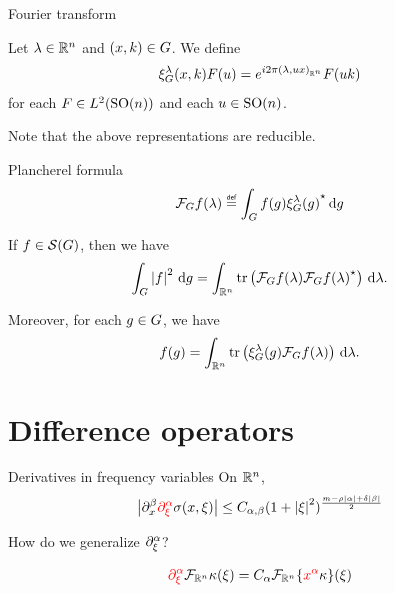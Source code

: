 \documentclass{beamer}
\begin{document}
\begin{frame}{Fourier transform}
    \begin{definition}[Representations]
        Let $\lambda \in \R^n$ and $(x, k) \in \Group$.
        We define
        \begin{align*}
            \Rep \lambda(x, k) F(u)
            = \e^{\i \turn \ip [\R^n] \lambda {u x}} F(u k)
        \end{align*}
        for each $F \in \Lebesgue 2 {\SpecialOrthogonalGroup n}$ and each $u \in \SpecialOrthogonalGroup n$.
    \end{definition}

    Note that the above representations are reducible.
\end{frame}

\begin{frame}{Plancherel formula}
    \begin{align*}
        \Fourier f(\lambda) \defeq \int_\Group f(g) \adj{\Rep \lambda(g)} \dd g
    \end{align*}

    \pause

    \begin{theorem}
        If $f \in \Schwartz \Group$,
        then we have
        \begin{align*}
            \int_\Group \abs f^2 \dd g
            = \int_{\R^n} \tr \left(\Fourier f(\lambda) \adj {\Fourier f(\lambda)}\right) \dd \lambda.
        \end{align*}

        Moreover,
        for each $g \in \Group$, we have
        \begin{align*}
            f(g)
            = \int_{\R^n} \tr \left(\Rep \lambda(g) \Fourier f(\lambda)\right) \dd \lambda.
        \end{align*}
    \end{theorem}
\end{frame}

\section{Difference operators}

\begin{frame}{Derivatives in frequency variables}
    On $\R^n$,
    \begin{align*}
        \abs {\iD {x^\beta} {\color{red} \iD {\xi^\alpha}} \sigma(x, \xi)}
        \leq C_{\alpha, \beta} (1 + \abs \xi^2)^{\frac {m - \rho \abs \alpha + \delta \abs \beta} 2}
    \end{align*}

    How do we generalize $\iD {\xi^\alpha}$?

    \pause

    \begin{align*}
        {\color{red} \iD {\xi^\alpha}} \Fourier [\R^n] \kappa(\xi)
        = C_\alpha \Fourier [\R^n] {\{{\color{red} x^\alpha} \kappa\}}(\xi)
    \end{align*}
\end{frame}
\end{document}
